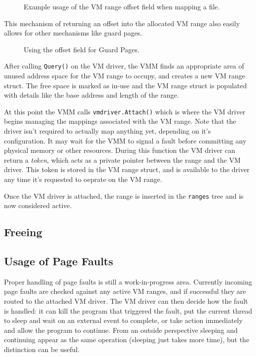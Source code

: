\begin{figure}[h]
\centering
\caption{Example usage of the VM range offset field when mapping a file.}
\end{figure}

This mechanism of returning an offset into the allocated VM range also easily allows for other mechanisms like guard pages.

\begin{figure}[h]
\centering
\caption{Using the offset field for Guard Pages.}
\end{figure}

After calling \verb|Query()| on the VM driver, the VMM finds an appropriate area of unused address space for the VM range to occupy, and creates a new VM range struct. The free space is marked as in-use and the VM range struct is populated with details like the base address and length of the range.

At this point the VMM calls \verb|vmdriver.Attach()| which is where the VM driver begins managing the mappings associated with the VM range. Note that the driver isn't required to actually map anything yet, depending on it's configuration. It may wait for the VMM to signal a fault before committing any physical memory or other resources. During this function the VM driver can return a \textit{token}, which acts as a private pointer between the range and the VM driver. This token is stored in the VM range struct, and is available to the driver any time it's requested to oeprate on the VM range.

Once the VM driver is attached, the range is inserted in the \verb|ranges| tree and is now considered active.

\subsection{Freeing}

\subsection{Usage of Page Faults}
Proper handling of page faults is still a work-in-progress area. Currently incoming page faults are checked against any active VM ranges, and if successful they are routed to the attached VM driver. The VM driver can then decide how the fault is handled: it can kill the program that triggered the fault, put the current thread to sleep and wait on an external event to complete, or take action immediately and allow the program to continue. From an outside perspective sleeping and continuing appear as the same operation (sleeping just takes more time), but the distinction can be useful.

